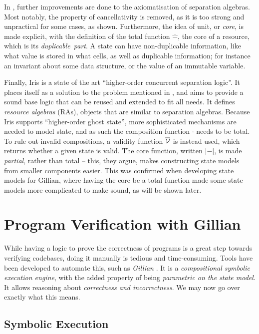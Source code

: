 In \cite{statesoundness}, further improvements are done to the axiomatisation of separation algebras. Most notably, the property of cancellativity is removed, as it is too strong and unpractical for some cases, as shown. Furthermore, the idea of unit, or \emph{core}, is made explicit, with the definition of the total function $\hat-$, the core of a resource, which is its \emph{duplicable~part}. A state can have non-duplicable information, like what value is stored in what cells, as well as duplicable information; for instance an invariant about some data structure, or the value of an immutable variable.

Finally, Iris \cite{iris1,iris2,iris3,iris} is a state of the art ``higher-order concurrent separation logic''. It places itself as a solution to the problem mentioned in \cite{next700seplogics}, and aims to provide a sound base logic that can be reused and extended to fit all needs. It defines \emph{resource algebras} (RAs), objects that are similar to separation algebras. Because Iris supports ``higher-order ghost state'', more sophisticated mechanisms are needed to model state, and as such the composition function $\cdot$ needs to be total. To rule out invalid compositions, a validity function $\overline{\cal V}$ is instead used, which returns whether a given state is valid. The core function, written $|-|$, is made \emph{partial}, rather than total -- this, they argue, makes constructing state models from smaller components easier. This was confirmed when developing state models for Gillian, where having the core be a total function made some state models more complicated to make sound, as will be shown later.

\section{Program Verification with Gillian} \label{sec:gillianverif}

While having a logic to prove the correctness of programs is a great step towards verifying codebases, doing it manually is tedious and time-consuming. Tools have been developed to automate this, such as \emph{Gillian} \cite{gillian0, gillian1, gillian2}. It is a \emph{compositional symbolic execution engine}, with the added property of being \emph{parametric on the state model}. It allows reasoning about \emph{correctness and incorrectness}. We may now go over exactly what this means.

\subsection{Symbolic Execution}

